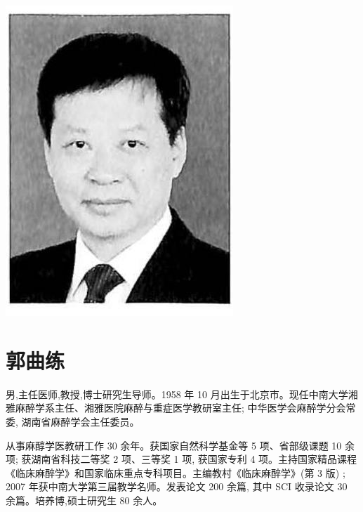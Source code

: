\documentclass[10pt]{article}
\begin{document}
\begin{center}
\includegraphics[max width=\textwidth]{2024_07_09_002a177993bd97d1d6d7g-014(1)}
\end{center}

\section*{郭曲练}
男,主任医师,教授,博士研究生导师。1958 年 10 月出生于北京市。现任中南大学湘雅麻醉学系主任、湘雅医院麻醉与重症医学教研室主任; 中华医学会麻醉学分会常委, 湖南省麻醉学会主任委员。

从事麻醇学医教研工作 30 余年。获国家自然科学基金等 5 项、省部级课题 10 余项; 获湖南省科技二等奖 2 项、三等奖 1 项, 获国家专利 4 项。主持国家精品课程《临床麻醉学》和国家临床重点专科项目。主编教村《临床麻醉学》(第 3 版) ; 2007 年获中南大学第三届教学名师。发表论文 200 余篇, 其中 SCI 收录论文 30 余篇。培养博,硕士研究生 80 余人。
\end{document}
